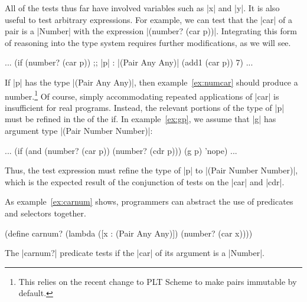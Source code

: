 \begin{schemeregion}
All of the tests thus far have involved variables
such as \scheme|x| and \scheme|y|.  It is also  useful
to test arbitrary expressions.  For example, we can test that the
\scheme|car| of a pair is a \scheme|Number| with the expression
\scheme|(number? (car p))|.
Integrating this form of reasoning into the type system requires
further modifications, as we will see.   

\begin{exmp}
\begin{schemedisplay}
... (if (number? (car p)) ;; \scheme|p| : \scheme|(Pair Any Any)|
        (add1 (car p))
        7) ...
\end{schemedisplay}
\label{ex:numcar}
\end{exmp}
\noindent
If \scheme|p| has the type \scheme|(Pair Any Any)|, then
example~\ref{ex:numcar} should produce a number.\footnote{This relies
  on the recent change to PLT Scheme to make pairs immutable by default.} 
Of course, simply accommodating repeated applications of \scheme|car|
is insufficient for real programs.  Instead, the relevant portions of
the type of \scheme|p| 
must be refined in the \tebranch of the if.
In example~\ref{ex:gp}, we assume that  \scheme|g| has argument type
\scheme|(Pair Number Number)|:

\begin{exmp}
\begin{schemedisplay}
... (if (and (number? (car p)) (number? (cdr p)))
        (g p)
        'nope) ...
\end{schemedisplay}
\label{ex:gp}
\end{exmp}
\noindent
 Thus, the test expression must refine
the type of \scheme|p| to \scheme|(Pair Number Number)|, which is the
expected result of the conjunction of tests on the \scheme|car| and
\scheme|cdr|.  

As example~{\ref{ex:carnum}} shows, programmers can abstract the use
of predicates and selectors together.  


\begin{exmp}
\begin{schemedisplay}
(define carnum?
  (lambda ([x : (Pair Any Any)]) (number? (car x))))
\end{schemedisplay}
\label{ex:carnum}
\end{exmp}
\noindent
The \scheme|carnum?| predicate tests if the \scheme|car| of its argument is a
\scheme|Number|.  


\end{schemeregion}
